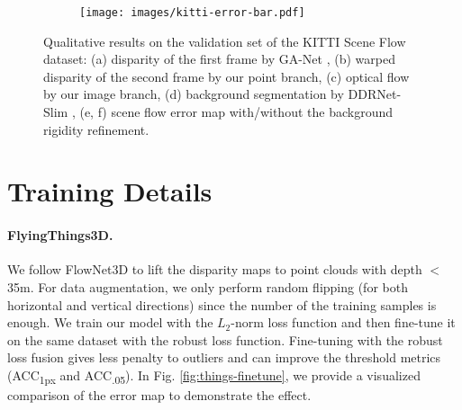 \documentclass[10pt,twocolumn,letterpaper]{article}
\begin{document}
\begin{figure*}
    \vspace{-3pt}
    \begin{subfigure}[b]{0.02\linewidth}
        \centering
    \end{subfigure}\hfill
    \begin{subfigure}[b]{0.956\linewidth}
        \texttt{[image: images/kitti-error-bar.pdf]}
    \end{subfigure}\hfill
    \begin{subfigure}[b]{0.02\linewidth}
        \centering
    \end{subfigure}\hfill

    \caption{Qualitative results on the validation set of the KITTI Scene Flow dataset: (a) disparity of the first frame by GA-Net \cite{zhang2019ganet}, (b) warped disparity of the second frame by our point branch, (c) optical flow by our image branch, (d) background segmentation by DDRNet-Slim \cite{hong2021ddrnet}, (e, f) scene flow error map with/without the background rigidity refinement.}
    \label{fig:more-kitti-val}
\end{figure*}

\section{Training Details}

\paragraph{FlyingThings3D.} We follow FlowNet3D \cite{liu2019flownet3d} to lift the disparity maps to point clouds with depth $<$35m. For data augmentation, we only perform random flipping (for both horizontal and vertical directions) since the number of the training samples is enough. We train our model with the $L_2$-norm loss function and then fine-tune it on the same dataset with the robust loss function. Fine-tuning with the robust loss fusion gives less penalty to outliers and can improve the threshold metrics (ACC\textsubscript{1px} and ACC\textsubscript{.05}). In Fig. \ref{fig:things-finetune}, we provide a visualized comparison of the error map to demonstrate the effect.
\end{document}
